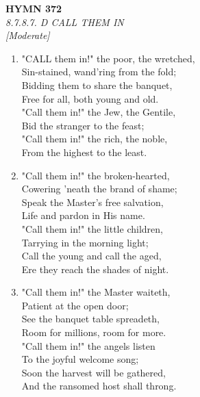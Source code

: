 \newpage
\begin{center}
    {\Large \textbf{HYMN 372}}
    \\
    \textit{8.7.8.7. D CALL THEM IN}
    \\
    \textit{\small [Moderate]}
\end{center}
\vspace{1em}

\begin{enumerate}
    \item "CALL them in!" the poor, the wretched, \\
        Sin-stained, wand'ring from the fold; \\
        Bidding them to share the banquet, \\
        Free for all, both young and old. \\
        "Call them in!" the Jew, the Gentile, \\
        Bid the stranger to the feast; \\
        "Call them in!" the rich, the noble, \\
        From the highest to the least.

    \item "Call them in!" the broken-hearted, \\
        Cowering 'neath the brand of shame; \\
        Speak the Master's free salvation, \\
        Life and pardon in His name. \\
        "Call them in!" the little children, \\
        Tarrying in the morning light; \\
        Call the young and call the aged, \\
        Ere they reach the shades of night.

    \item "Call them in!" the Master waiteth, \\
        Patient at the open door; \\
        See the banquet table spreadeth, \\
        Room for millions, room for more. \\
        "Call them in!" the angels listen \\
        To the joyful welcome song; \\
        Soon the harvest will be gathered, \\
        And the ransomed host shall throng.

\end{enumerate}

